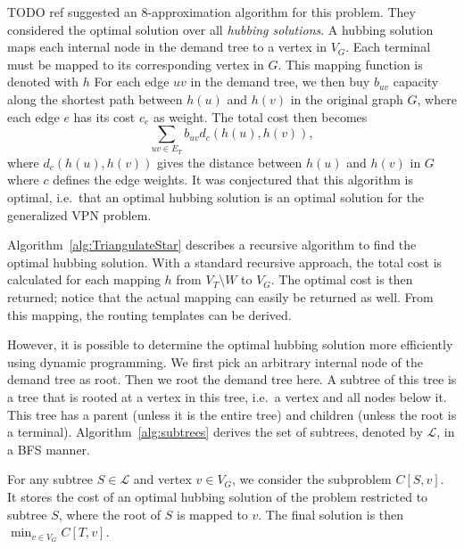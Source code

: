 TODO ref suggested an 8-approximation algorithm for this problem. %
They considered the optimal solution over all \emph{hubbing solutions}.
A hubbing solution maps each internal node in the demand tree to a vertex in $V_G$.
Each terminal must be mapped to its corresponding vertex in $G$.
This mapping function is denoted with $h$
For each edge $uv$ in the demand tree, we then buy $b_{uv}$ capacity along the shortest path between $h(u)$ and $h(v)$ in the original graph $G$, where each edge $e$ has its cost $c_e$ as weight.
The total cost then becomes
\[
    \sum_{uv \in E_T} b_{uv} d_c(h(u), h(v)),
\]
where $d_c(h(u), h(v))$ gives the distance between $h(u)$ and $h(v)$ in $G$ where $c$ defines the edge weights.
It was conjectured that this algorithm is optimal, i.e.\ that an optimal hubbing solution is an optimal solution for the generalized VPN problem.

Algorithm~\ref{alg:TriangulateStar} describes a recursive algorithm to find the optimal hubbing solution.
With a standard recursive approach, the total cost is calculated for each mapping $h$ from $V_T \setminus W$ to $V_G$.
The optimal cost is then returned; notice that the actual mapping can easily be returned as well.
From this mapping, the routing templates can be derived.

However, it is possible to determine the optimal hubbing solution more efficiently using dynamic programming. %
We first pick an arbitrary internal node of the demand tree as root.
Then we root the demand tree here.
A subtree of this tree is a tree that is rooted at a vertex in this tree, i.e.\ a vertex and all nodes below it.
This tree has a parent (unless it is the entire tree) and children (unless the root is a terminal).
Algorithm~\ref{alg:subtrees} derives the set of subtrees, denoted by $\mathcal L$, in a BFS manner.

For any subtree $S \in \mathcal L$ and vertex $v \in V_G$, we consider the subproblem $C[S, v]$.
It stores the cost of an optimal hubbing solution of the problem restricted to subtree $S$, where the root of $S$ is mapped to $v$.
The final solution is then $\min_{v \in V_G} C[T, v]$.

